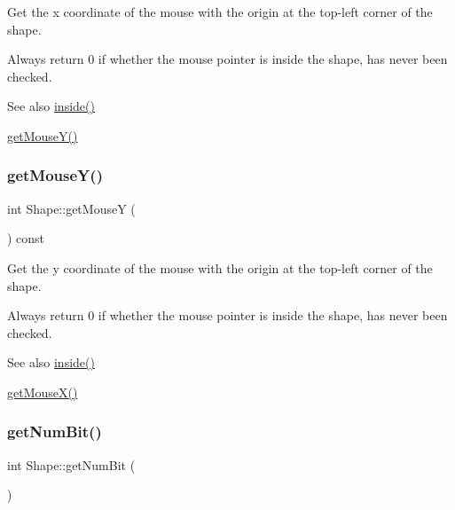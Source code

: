 Get the x coordinate of the mouse with the origin at the top-\/left corner of the shape. 

Always return 0 if whether the mouse pointer is inside the shape, has never been checked. \begin{DoxySeeAlso}{See also}
\mbox{\hyperlink{class_shape_a4c01d871d08fae8b9ab27fa808f8056a}{inside()}} 

\mbox{\hyperlink{class_shape_a7e4e469fca3e49bd2836a9a2798f14a1}{get\+Mouse\+Y()}} 
\end{DoxySeeAlso}
\mbox{\label{class_shape_a7e4e469fca3e49bd2836a9a2798f14a1}} 
\subsubsection{\texorpdfstring{get\+Mouse\+Y()}{getMouseY()}}
{\footnotesize\ttfamily int Shape\+::get\+MouseY (\begin{DoxyParamCaption}{ }\end{DoxyParamCaption}) const\hspace{0.3cm}{\ttfamily [inline]}}



Get the y coordinate of the mouse with the origin at the top-\/left corner of the shape. 

Always return 0 if whether the mouse pointer is inside the shape, has never been checked. \begin{DoxySeeAlso}{See also}
\mbox{\hyperlink{class_shape_a4c01d871d08fae8b9ab27fa808f8056a}{inside()}} 

\mbox{\hyperlink{class_shape_aef8956ea2a795d59df6fad328b0b85b8}{get\+Mouse\+X()}} 
\end{DoxySeeAlso}
\mbox{\label{class_shape_a87f7e888ab40590dd3e4f73e13514152}} 
\subsubsection{\texorpdfstring{get\+Num\+Bit()}{getNumBit()}}
{\footnotesize\ttfamily int Shape\+::get\+Num\+Bit (\begin{DoxyParamCaption}{ }\end{DoxyParamCaption})\hspace{0.3cm}{\ttfamily [inline]}}



